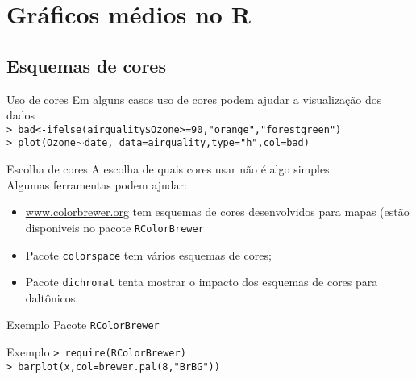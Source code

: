 \documentclass{beamer}
\begin{document}
\section{Gráficos médios no R}
\subsection{Esquemas de cores}
\begin{frame}{Uso de cores}
Em alguns casos uso de cores podem ajudar a visualização dos dados \\
\texttt{> bad<-ifelse(airquality\$Ozone>=90,"orange","forestgreen")\\
> plot(Ozone$\sim$date, data=airquality,type="h",col=bad)}
\begin{center}
   
\end{center}
\end{frame}

\begin{frame}{Escolha de cores}
A escolha de quais cores usar não é algo simples. \\
Algumas ferramentas podem ajudar:
\begin{itemize}
\item \url{www.colorbrewer.org} tem esquemas de cores desenvolvidos para mapas (estão disponiveis no pacote \texttt{RColorBrewer}
\item Pacote \texttt{colorspace} tem vários esquemas de cores;
\item Pacote \texttt{dichromat} tenta mostrar o impacto dos esquemas de cores para daltônicos.
\end{itemize}
\end{frame}

\begin{frame}{Exemplo}
Pacote \texttt{RColorBrewer}\\
\centering
{}
\end{frame}
\begin{frame}{Exemplo}
\texttt{> require(RColorBrewer)\\
> barplot(x,col=brewer.pal(8,"BrBG"))}

\begin{center}
\end{center}
\end{frame}
\end{document}
